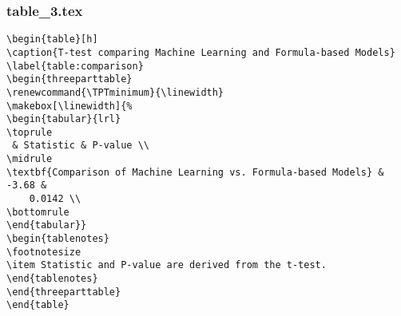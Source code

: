 \documentclass[11pt]{article}
\begin{document}
\subsubsection*{table\_3.tex}

\begin{Verbatim}[tabsize=4]
\begin{table}[h]
\caption{T-test comparing Machine Learning and Formula-based Models}
\label{table:comparison}
\begin{threeparttable}
\renewcommand{\TPTminimum}{\linewidth}
\makebox[\linewidth]{%
\begin{tabular}{lrl}
\toprule
 & Statistic & P-value \\
\midrule
\textbf{Comparison of Machine Learning vs. Formula-based Models} & -3.68 &
	0.0142 \\
\bottomrule
\end{tabular}}
\begin{tablenotes}
\footnotesize
\item Statistic and P-value are derived from the t-test.
\end{tablenotes}
\end{threeparttable}
\end{table}

\end{Verbatim}




\end{document}
